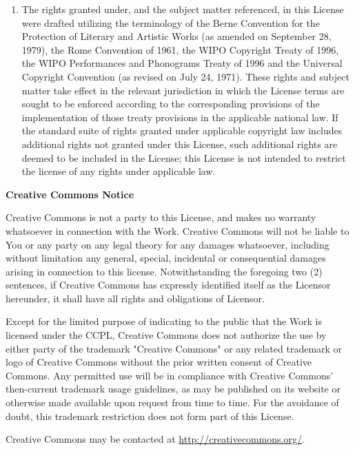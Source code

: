 \begin{enumerate}
\begin{enumerate}
            \item The rights granted under, and the subject matter referenced,
                in this License were drafted utilizing the terminology of the
                Berne Convention for the Protection of Literary and Artistic
                Works (as amended on September 28, 1979), the Rome Convention
                of 1961, the WIPO Copyright Treaty of 1996, the WIPO
                Performances and Phonograms Treaty of 1996 and the Universal
                Copyright Convention (as revised on July 24, 1971). These
                rights and subject matter take effect in the relevant
                jurisdiction in which the License terms are sought to be
                enforced according to the corresponding provisions of the
                implementation of those treaty provisions in the applicable
                national law. If the standard suite of rights granted under
                applicable copyright law includes additional rights not granted
                under this License, such additional rights are deemed to be
                included in the License; this License is not intended to
                restrict the license of any rights under applicable law.

        \end{enumerate}
\end{enumerate}

\textbf{Creative Commons Notice}

Creative Commons is not a party to this License, and makes no warranty
whatsoever in connection with the Work. Creative Commons will not be liable to
You or any party on any legal theory for any damages whatsoever, including
without limitation any general, special, incidental or consequential damages
arising in connection to this license. Notwithstanding the foregoing two (2)
sentences, if Creative Commons has expressly identified itself as the Licensor
hereunder, it shall have all rights and obligations of Licensor.

Except for the limited purpose of indicating to the public that the Work is
licensed under the CCPL, Creative Commons does not authorize the use by either
party of the trademark "Creative Commons" or any related trademark or logo of
Creative Commons without the prior written consent of Creative Commons. Any
permitted use will be in compliance with Creative Commons' then-current
trademark usage guidelines, as may be published on its website or otherwise
made available upon request from time to time. For the avoidance of doubt, this
trademark restriction does not form part of this License.

Creative Commons may be contacted at \url{http://creativecommons.org/}.

